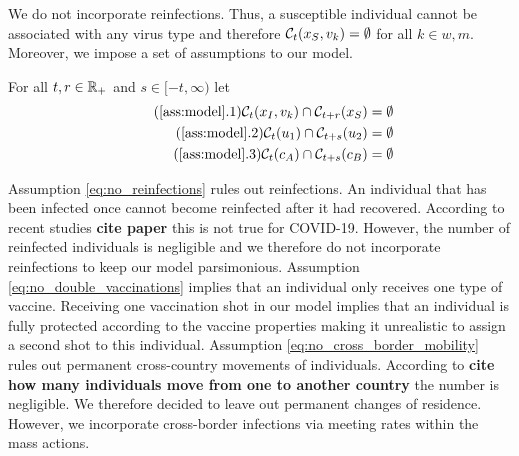 We do not incorporate reinfections. Thus, a susceptible individual cannot be associated with any virus type and therefore $\mathcal{C}_t(x_S, v_k) = \emptyset$ for all $k \in {w,m}$. Moreover, we impose a set of assumptions to our model. 
\begin{assumption}\label{ass:model}
For all $t,r \in \mathbb{R}_+$ and $s \in [-t, \infty)$ let
\begin{align*}
\tag{\ref{ass:model}.1} 
\label{eq:no_reinfections}
\set(x_I, v_k) \cap \mathcal{C}_{t+r}(x_S) &= \emptyset \\
\tag{\ref{ass:model}.2} 
\label{eq:no_double_vaccinations}
\set(u_1) \cap \mathcal{C}_{t+s}(u_2) &= \emptyset \\
\tag{\ref{ass:model}.3} 
\label{eq:no_cross_border_mobility}
\set(c_A) \cap \mathcal{C}_{t+s}(c_B) &= \emptyset 
\end{align*}
\end{assumption}
Assumption \ref{eq:no_reinfections} rules out reinfections. An individual that has been infected once cannot become reinfected after it had recovered. According to recent studies \textbf{cite paper} this is not true for COVID-19. However, the number of reinfected individuals is negligible and we therefore do not incorporate reinfections to keep our model parsimonious. Assumption \ref{eq:no_double_vaccinations} implies that an individual only receives one type of vaccine. Receiving one vaccination shot in our model implies that an individual is fully protected according to the vaccine properties making it unrealistic to assign a second shot to this individual. Assumption \ref{eq:no_cross_border_mobility} rules out permanent cross-country movements of individuals. According to \textbf{cite how many individuals move from one to another country} the number is negligible. We therefore decided to leave out permanent changes of residence. However, we incorporate cross-border infections via meeting rates within the mass actions.

